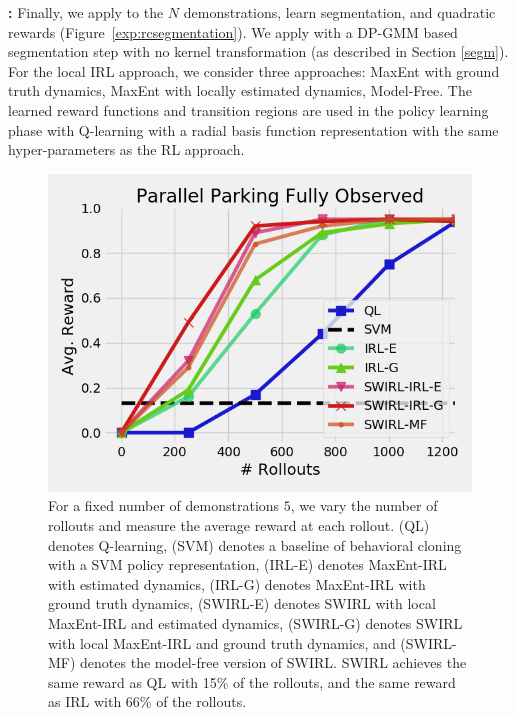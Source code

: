 \vspace{0.25em}\noindent \textbf{\hirl: } Finally, we apply \hirl to the $N$ demonstrations, learn segmentation, and quadratic rewards (Figure~\ref{exp:rcsegmentation}).
We apply \hirl with a DP-GMM based segmentation step with no kernel transformation (as described in Section \ref{segm}).
For the local IRL approach, we consider three approaches: MaxEnt with ground truth dynamics, MaxEnt with locally estimated dynamics, Model-Free. 
The learned reward functions and transition regions are used in the policy learning phase with Q-learning with a radial basis function representation with the same hyper-parameters as the RL approach.

\vspace{0.5em}

\begin{figure}[t]
\centering
 \includegraphics[width=\columnwidth]{new-exp/pp-fo.png}
 \caption{For a fixed number of demonstrations $5$, we vary the number of rollouts and measure the average reward at each rollout. (QL) denotes Q-learning, (SVM) denotes a baseline of behavioral cloning with a SVM policy representation, (IRL-E) denotes MaxEnt-IRL with estimated dynamics, (IRL-G) denotes MaxEnt-IRL with ground truth dynamics, (SWIRL-E) denotes SWIRL with local MaxEnt-IRL and estimated dynamics, (SWIRL-G) denotes SWIRL with local MaxEnt-IRL and ground truth dynamics, and (SWIRL-MF) denotes the model-free version of SWIRL. SWIRL achieves the same reward as QL with 15\% of the rollouts, and the same reward as IRL with 66\% of the rollouts. \label{exp:pp-fo1}}
\end{figure}

